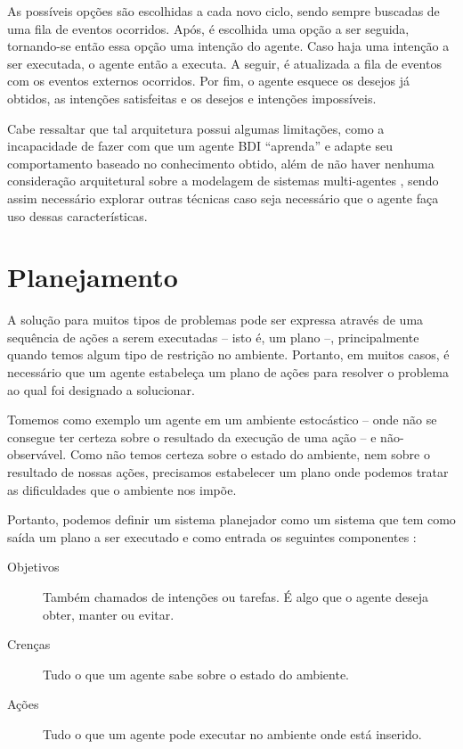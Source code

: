 As possíveis opções são escolhidas a cada novo ciclo, sendo sempre buscadas de
uma fila de eventos ocorridos. Após, é escolhida uma opção a ser seguida,
tornando-se então essa opção uma intenção do agente. Caso haja uma intenção a
ser executada, o agente então a executa. A seguir, é atualizada a fila de
eventos com os eventos externos ocorridos. Por fim, o agente esquece os desejos
já obtidos, as intenções satisfeitas e os desejos e intenções impossíveis.

Cabe ressaltar que tal arquitetura possui algumas limitações, como a
incapacidade de fazer com que um agente BDI ``aprenda'' e adapte seu
comportamento baseado no conhecimento obtido, além de não haver nenhuma
consideração arquitetural sobre a modelagem de sistemas multi-agentes
\cite{Georgeff:1998:BMA:648205.749450}, sendo assim necessário explorar
outras técnicas caso seja necessário que o agente faça uso dessas
características.

\section{Planejamento}

A solução para muitos tipos de problemas pode ser expressa através de uma
sequência de ações a serem executadas -- isto é, um plano --, principalmente
quando temos algum tipo de restrição no ambiente. Portanto, em muitos casos, é
necessário que um agente estabeleça um plano de ações para resolver o problema
ao qual foi designado a solucionar.

Tomemos como exemplo um agente em um ambiente estocástico -- onde não se
consegue ter certeza sobre o resultado da execução de uma ação -- e
não-observável. Como não temos certeza sobre o estado do ambiente, nem sobre o
resultado de nossas ações, precisamos estabelecer um plano onde podemos tratar
as dificuldades que o ambiente nos impõe.

Portanto, podemos definir um sistema planejador como um sistema que tem como
saída um plano a ser executado e como entrada os seguintes componentes
\cite{Woolridge:2001:IMS:559667}:

\begin{description}
\item [Objetivos]
Também chamados de intenções ou tarefas. É algo que o agente deseja obter,
manter ou evitar.

\item [Crenças]
Tudo o que um agente sabe sobre o estado do ambiente.

\item [Ações]
Tudo o que um agente pode executar no ambiente onde está inserido.
\end{description}

